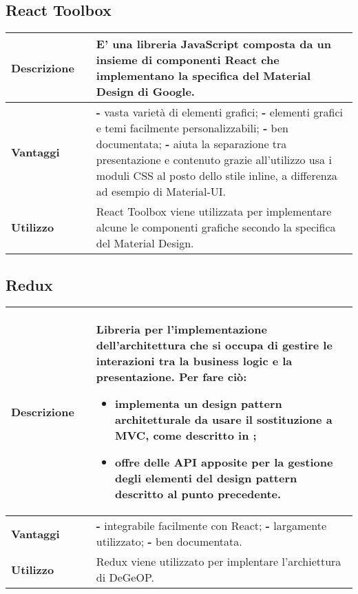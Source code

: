 \subsection{React Toolbox}
\label{React Toolbox}
\begin{table}[H]
	\centering
	\begin{tabular}{p{2cm}p{0.5cm}p{11.5cm}}
		\arrayrulecolor{lightgray}
		\toprule
		\textbf{Descrizione} & &
		E' una libreria JavaScript composta da un insieme di componenti React che implementano la specifica del Material Design di Google.
		\\ \midrule
		\textbf{Vantaggi} & &
		\textbf{- } vasta varietà di elementi grafici; \newline
		\textbf{- } elementi grafici e temi facilmente personalizzabili; \newline
		\textbf{- } ben documentata; \newline
		\textbf{- } aiuta la separazione tra presentazione e contenuto grazie all'utilizzo usa i moduli CSS al posto dello stile inline, a differenza ad esempio di Material-UI.
		\\ \midrule
		\textbf{Utilizzo} & &
		React Toolbox viene utilizzata per implementare alcune le componenti grafiche secondo la specifica del Material Design.
		\\\bottomrule
	\end{tabular}
\end{table}



\newpage
\subsection{Redux}
\label{Redux}
\begin{table}[H]
	\centering
	\begin{tabular}{p{2cm}p{0.5cm}p{11.5cm}}
		\arrayrulecolor{lightgray}
		\toprule
		\textbf{Descrizione} & &
		Libreria per l’implementazione dell’architettura che si occupa di gestire le interazioni tra la business logic e la presentazione.
		Per fare ciò:
		\begin{itemize}
			\item implementa un design pattern architetturale da usare il sostituzione a MVC, come descritto in
			\nameref{dp_Redux};
			\item offre delle API apposite per la gestione degli elementi del design pattern descritto al punto precedente.
		\end{itemize}
		\\ \midrule
		\textbf{Vantaggi} & &
		\textbf{- } integrabile facilmente con React; \newline
		\textbf{- } largamente utilizzato; \newline
		\textbf{- } ben documentata.
		\\ \midrule
		\textbf{Utilizzo} & &
		Redux viene utilizzato per implentare l'archiettura di DeGeOP.
		\\\bottomrule
	\end{tabular}
\end{table}



